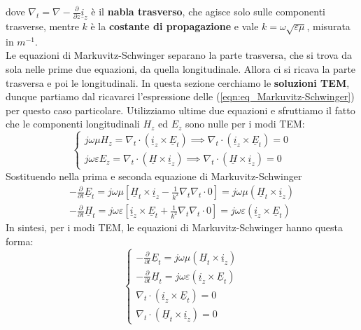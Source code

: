 \documentclass{book}
\begin{document}
    dove $\nabla_{t} = \nabla - \frac{\partial}{\partial z} \underline{i}_{z}$ è il \textbf{nabla trasverso}, che agisce solo
    sulle componenti trasverse, mentre $k$ è la \textbf{costante di propagazione} e vale $k=\omega \sqrt{\varepsilon \mu}$, misurata in $m^{-1}$.
    \\ Le equazioni di Markuvitz-Schwinger separano la parte trasversa, che si trova  da sola nelle prime due equazioni, da quella longitudinale.
    Allora ci si ricava la parte trasversa e poi le longitudinali.
    In questa sezione cerchiamo le \textbf{soluzioni TEM}, dunque partiamo dal ricavarci l'espressione delle (\ref{eqn:eq_Markuvitz-Schwinger}) per questo caso particolare. Utilizziamo ultime due equazioni e sfruttiamo il fatto che le componenti longitudinali 
    $H_{z}$ ed $E_{z}$ sono nulle per i modi TEM:
    \begin{equation}
        \begin{cases}
            j \omega \mu H_{z} = \nabla_{t} \cdot (\underline{i}_{z} \times \underline{E}_{t})  \implies \nabla_{t} \cdot (\underline{i}_{z} \times \underline{E}_{t}) = 0 \\
            j \omega \varepsilon E_{z} = \nabla_{t} \cdot (\underline{H} \times \underline{i}_{z})  \implies \nabla_{t} \cdot (\underline{H} \times \underline{i}_{z}) = 0
        \end{cases}
    \end{equation}
    Sostituendo nella prima e seconda equazione di Markuvitz-Schwinger
    \begin{align}
        -\frac{\partial}{\partial t} \underline{E}_{t} = j \omega \mu [\underline{H}_{t} \times \underline{i}_{z} - \frac{1}{k^{2}}\nabla_{t}\nabla_{t}\cdot 0] = j \omega \mu(\underline{H}_{t} \times \underline{i}_{z}) \\
        -\frac{\partial}{\partial t} \underline{H}_{t} = j \omega \varepsilon [\underline{i}_{z}\times \underline{E}_{t}+\frac{1}{k^{2}}\nabla_{t}\nabla_{t} \cdot 0] = j \omega \varepsilon (\underline{i}_{z} \times \underline{E}_{t})
    \end{align}
    In sintesi, per i modi TEM, le equazioni di Markuvitz-Schwinger hanno questa forma:
    \begin{equation}
        \label{eqn:MS_TEM}
        \begin{cases}
            -\frac{\partial}{\partial t}\underline{E}_{t} = j \omega \mu (\underline{H}_{t} \times \underline{i}_{z}) \\
            -\frac{\partial}{\partial t} \underline{H}_{t} = j \omega \varepsilon (\underline{i}_{z} \times \underline{E}_{t}) \\
            \nabla_{t} \cdot (\underline{i}_{z} \times \underline{E}_{t}) = 0 \\
            \nabla_{t} \cdot (\underline{H}_{t} \times \underline{i}_{z}) = 0
        \end{cases}
    \end{equation}
\end{document}
